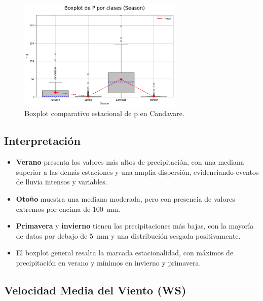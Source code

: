 \vspace{0.2cm}

\begin{figure}[htbp]
\centering
\includegraphics[width=0.7\textwidth]{resultados/por_estacion_del_anio/boxplot_clases_por_estacion/Candavare/P_ClassBoxplot_Season.png}
\caption{Boxplot comparativo estacional de \gls{p}  en Candavare.}
\label{fig:candavare_p_box}
\end{figure}

\subsection*{Interpretación}

\begin{itemize}
    \item \textbf{Verano} presenta los valores más altos de precipitación, con una mediana superior a las demás estaciones y una amplia dispersión, evidenciando eventos de lluvia intensos y variables.
    \item \textbf{Otoño} muestra una mediana moderada, pero con presencia de valores extremos por encima de 100~mm.
    \item \textbf{Primavera} y \textbf{invierno} tienen las precipitaciones más bajas, con la mayoría de datos por debajo de 5~mm y una distribución sesgada positivamente.
    \item El boxplot general resalta la marcada estacionalidad, con máximos de precipitación en verano y mínimos en invierno y primavera.
\end{itemize}

\subsection{Velocidad Media del Viento (WS)}

